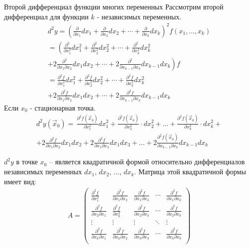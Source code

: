 \begin{tbox}{Второй дифференциал функции многих переменных}
	Рассмотрим второй дифференциал для функции $k$ - независимых переменных.
	\begin{multline*}
		d^2 y = \left(\frac{\partial}{\partial x_1} dx_1 + \frac{\partial}{\partial x_2} dx_2 + \cdots + \frac{\partial}{\partial x_k} dx_k\right)^2 f(x_1, \ldots, x_k) \\
		= \left(\frac{\partial^2}{\partial x_1^2} dx_1^2 + \frac{\partial^2}{\partial x_2^2} dx_2^2 + \cdots + \frac{\partial^2}{\partial x_k^2} dx_k^2 \right. \\
		\left. + 2\frac{\partial^2}{\partial x_1 \partial x_2} dx_1 dx_2 + \cdots + 2\frac{\partial^2}{\partial x_{k-1} \partial x_k} dx_{k-1} dx_k\right) f \\
		= \frac{\partial^2 f}{\partial x_1^2} dx_1^2 + \frac{\partial^2 f}{\partial x_2^2} dx_2^2 + \cdots + \frac{\partial^2 f}{\partial x_k^2} dx_k^2 \\
		+ 2\frac{\partial^2 f}{\partial x_1 \partial x_2} dx_1 dx_2 + \cdots + 2\frac{\partial^2 f}{\partial x_{k-1} \partial x_k} dx_{k-1} dx_k
	\end{multline*}
	Если $x_0$ - стационарная точка.
	\begin{multline*}
		d^2 y\left(\vec{x}_0\right)= \,\frac{\partial^2 f\left(\vec{x}_0\right)}{\partial x_1^2} d x_1^2+\frac{\partial^2 f\left(\vec{x}_0\right)}{\partial x_2^2} \cdot d x_2^2+...+ \frac{\partial^2 f\left(\vec{x}_0\right)}{\partial x_k^2} \cdot d x_k^2+ \\
		+2\frac{\partial^2 f}{\partial x_1 \partial x_2} d x_1 d x_2+2\frac{\partial^2 f}{\partial x_1 \partial x_3} d x_1 d x_3+\ldots+2\frac{\partial^2 f\left(\vec{x}_0\right)}{\partial x_{k-1} \partial x_k} d x_{k-1} d x_k
	\end{multline*}

	$d^2 y$ в точке $x_0$ -- является квадратичной формой относительно дифференциалов независимых переменных $d x_1$, $d x_2$, ..., $d x_k$. Матрица этой квадратичной формы имеет вид:
	\begin{equation*}
		\begin{aligned}
			A = \begin{pmatrix}
				\frac{\partial^2 f}{\partial x_1^2} & \frac{\partial^2 f}{\partial x_1 \partial x_2} & \frac{\partial^2 f}{\partial x_1 \partial x_3} & \cdots & \frac{\partial^2 f}{\partial x_1 \partial x_k} \\
				\frac{\partial^2 f}{\partial x_2 \partial x_1} & \frac{\partial^2 f}{\partial x_2^2} & \frac{\partial^2 f}{\partial x_2 \partial x_3} & \cdots & \frac{\partial^2 f}{\partial x_2 \partial x_k} \\
				\vdots & \vdots & \vdots & \ddots & \vdots \\
				\frac{\partial^2 f}{\partial x_k \partial x_1} & \frac{\partial^2 f}{\partial x_k \partial x_2} & \frac{\partial^2 f}{\partial x_k \partial x_3} & \cdots & \frac{\partial^2 f}{\partial x_k \partial x_k} \\
			\end{pmatrix}
		\end{aligned}
	\end{equation*}


\end{tbox}
